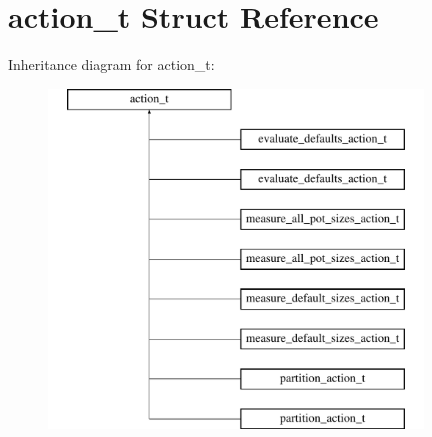 \hypertarget{structaction__t}{}\section{action\+\_\+t Struct Reference}
\label{structaction__t}
Inheritance diagram for action\+\_\+t\+:\begin{figure}[H]
\begin{center}
\leavevmode
\includegraphics[height=9.000000cm]{structaction__t}
\end{center}
\end{figure}
